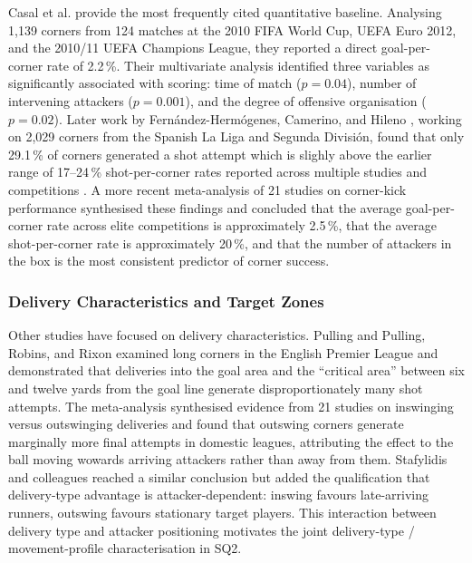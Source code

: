 Casal et al. \cite{Casal2015} provide the most frequently cited
quantitative baseline. Analysing 1{,}139 corners from 124 matches at the 2010
FIFA World Cup, UEFA Euro 2012, and the 2010/11 UEFA Champions League, they
reported a direct goal-per-corner rate of 2.2\,\%. Their multivariate analysis
identified three variables as significantly associated with scoring: time of
match ($p = 0.04$), number of intervening attackers ($p = 0.001$), and the
degree of offensive organisation ($p = 0.02$). Later work by
Fern\'andez-Herm\'ogenes, Camerino, and Hileno \cite{FernandezH2021},
working on 2{,}029 corners from the Spanish La Liga and Segunda Divisi\'on,
found that only 29.1\,\% of corners generated a shot attempt which is slighly above 
the earlier range of 17--24\,\% shot-per-corner rates reported across
multiple studies and competitions \citep{Borras2005, SainzdeBaranda2012,
SanchezFlores2012}. A more recent meta-analysis of 21 studies
 on corner-kick performance \cite{JCSS2025} synthesised these findings and concluded
  that the average goal-per-corner rate across elite competitions is approximately 
  2.5\,\%, that the average shot-per-corner rate is approximately 20\,\%, and that 
  the number of attackers in the box is the most consistent predictor of corner success.

\subsubsection{Delivery Characteristics and Target Zones}

Other studies have focused on delivery
characteristics. Pulling \cite{Pulling2015} and Pulling, Robins, and
Rixon \cite{Pulling2013} examined long corners in the English Premier
League and demonstrated that deliveries into the goal area and the ``critical
area'' between six and twelve yards from the goal line generate
disproportionately many shot attempts. The meta-analysis \citep{JCSS2025} 
synthesised evidence from 21 studies on inswinging versus outswinging deliveries 
and found that outswing corners generate marginally more final attempts in 
domestic leagues, attributing the effect to the ball moving wowards arriving attackers 
rather than away from them. Stafylidis and colleagues \cite{Stafylidis2022, Stafylidis2023}
reached a similar conclusion but added the qualification that delivery-type
advantage is attacker-dependent: inswing favours late-arriving runners, outswing
favours stationary target players. This interaction between delivery type and
attacker positioning motivates the joint delivery-type / movement-profile
characterisation in SQ2.

